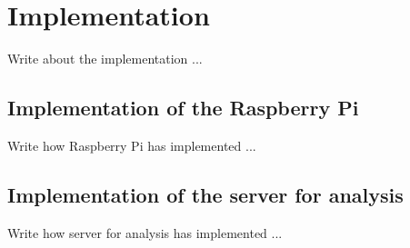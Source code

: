\chapter{Implementation}
\label{cha:implementation}
\vspace{0.5 cm} 

Write about the implementation ...


\vspace{0.5 cm} 
\section{Implementation of the Raspberry Pi}
\label{sec:impwork}
\vspace{0.5 cm} 

Write how Raspberry Pi has implemented ...


\vspace{0.5 cm} 
\section{Implementation of the server for analysis}
\label{sec:impwork}
\vspace{0.5 cm} 

Write how server for analysis has implemented ...
